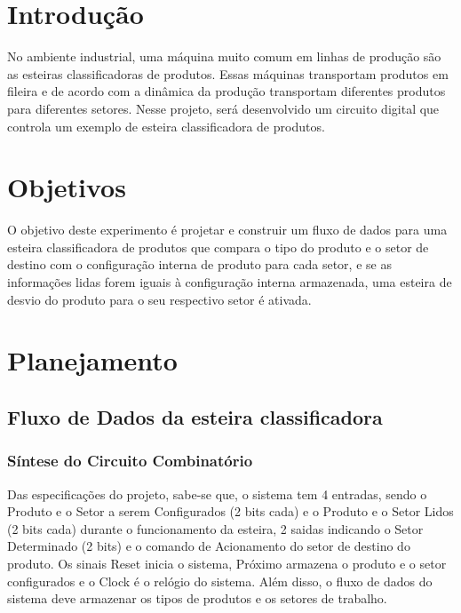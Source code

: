 \documentclass[a4,12pt]{horizon-theme}
\begin{document}
\horizonCover
\horizonTitle

\section{Introdução} %
    No ambiente industrial, uma máquina muito comum em linhas de produção são as esteiras classificadoras de produtos. Essas máquinas transportam produtos em fileira e de acordo com a dinâmica da produção transportam diferentes produtos para diferentes setores. Nesse projeto, será desenvolvido um circuito digital que controla um exemplo de esteira classificadora de produtos. 

\section{Objetivos} %
    O objetivo deste experimento é projetar e construir um fluxo de dados para uma esteira classificadora de produtos que compara o tipo do produto e o setor de destino com o configuração interna de produto para cada setor, e se as informações lidas forem iguais à configuração interna armazenada, uma esteira de desvio do produto para o seu respectivo setor é ativada.

\section{Planejamento} %
\label{sec:plan}

\subsection{Fluxo de Dados da esteira classificadora}
\label{sec:plan_FD}

\subsubsection{Síntese do Circuito Combinatório}
\label{sec:plan_sintese}
    Das especificações do projeto, sabe-se que, o sistema tem 4 entradas, sendo o Produto e o Setor a serem Configurados (2 bits cada) e o Produto e o Setor Lidos (2 bits cada) durante o funcionamento da esteira, 2 saidas indicando o Setor Determinado (2 bits) e o comando de Acionamento do setor de destino do produto. Os sinais Reset inicia o sistema, Próximo armazena o produto e o setor configurados e o Clock é o relógio do sistema. Além disso, o fluxo de dados do sistema deve armazenar os tipos de produtos e os setores de trabalho.
\end{document}
